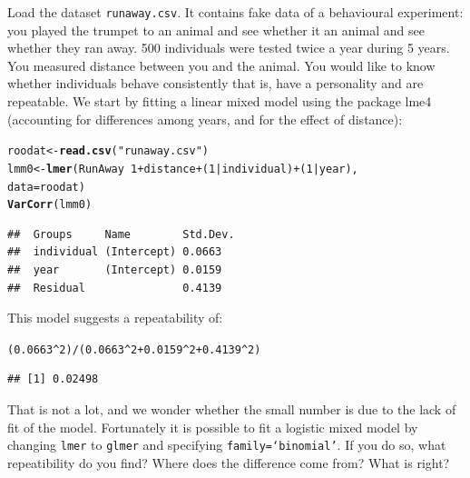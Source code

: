 \documentclass[12pt,a4paper]{scrartcl}\usepackage[]{graphicx}\usepackage[]{color}
\makeatletter
\newcommand{\hlnum}[1]{\textcolor[rgb]{0.686,0.059,0.569}{#1}}%
\newcommand{\hlstr}[1]{\textcolor[rgb]{0.192,0.494,0.8}{#1}}%
\newcommand{\hlopt}[1]{\textcolor[rgb]{0,0,0}{#1}}%
\newcommand{\hlstd}[1]{\textcolor[rgb]{0.345,0.345,0.345}{#1}}%
\newcommand{\hlkwb}[1]{\textcolor[rgb]{0.69,0.353,0.396}{#1}}%
\newcommand{\hlkwc}[1]{\textcolor[rgb]{0.333,0.667,0.333}{#1}}%
\newcommand{\hlkwd}[1]{\textcolor[rgb]{0.737,0.353,0.396}{\textbf{#1}}}%
\newenvironment{kframe}{%
 \def\at@end@of@kframe{}%
 \ifinner\ifhmode%
  \def\at@end@of@kframe{\end{minipage}}%
  \begin{minipage}{\columnwidth}%
 \fi\fi%
 \def\FrameCommand##1{\hskip\@totalleftmargin \hskip-\fboxsep
 \colorbox{shadecolor}{##1}\hskip-\fboxsep
     \hskip-\linewidth \hskip-\@totalleftmargin \hskip\columnwidth}%
 \MakeFramed {\advance\hsize-\width
   \@totalleftmargin\z@ \linewidth\hsize
   \@setminipage}}%
 {\par\unskip\endMakeFramed%
 \at@end@of@kframe}
\newenvironment{knitrout}{}{} %
\makeatother
\begin{document}
\begin{Exercise}[difficulty=2, title={Repeatability, on what scale?}]
Load the dataset \texttt{runaway.csv}. It contains fake data of a behavioural experiment: you played the trumpet to an animal and see whether it an animal and see whether they ran away. 500 individuals were tested twice a year during 5 years. You measured distance between you and the animal. You would like to know whether individuals behave consistently that is, have a personality and are repeatable. We start by fitting a linear mixed model using the package lme4 (accounting for differences among years, and for the effect of distance):
\begin{knitrout}
\color{fgcolor}\begin{kframe}
\begin{alltt}
\hlstd{roodat} \hlkwb{<-} \hlkwd{read.csv}\hlstd{(}\hlstr{"runaway.csv"}\hlstd{)}
\hlstd{lmm0} \hlkwb{<-} \hlkwd{lmer}\hlstd{(RunAway} \hlopt{~} \hlnum{1} \hlopt{+} \hlstd{distance} \hlopt{+}\hlstd{(}\hlnum{1}\hlopt{|}\hlstd{individual)} \hlopt{+} \hlstd{(}\hlnum{1}\hlopt{|}\hlstd{year),}
             \hlkwc{data} \hlstd{= roodat)}
\hlkwd{VarCorr}\hlstd{(lmm0)}
\end{alltt}
\begin{verbatim}
##  Groups     Name        Std.Dev.
##  individual (Intercept) 0.0663  
##  year       (Intercept) 0.0159  
##  Residual               0.4139
\end{verbatim}
\end{kframe}
\end{knitrout}
This model suggests a repeatability of:
\begin{knitrout}
\color{fgcolor}\begin{kframe}
\begin{alltt}
\hlstd{(}\hlnum{0.0663}\hlopt{^}\hlnum{2}\hlstd{)}\hlopt{/}\hlstd{(}\hlnum{0.0663}\hlopt{^}\hlnum{2}\hlopt{+}\hlnum{0.0159}\hlopt{^}\hlnum{2}\hlopt{+}\hlnum{0.4139}\hlopt{^}\hlnum{2}\hlstd{)}
\end{alltt}
\begin{verbatim}
## [1] 0.02498
\end{verbatim}
\end{kframe}
\end{knitrout}
That is not a lot, and we wonder whether the small number is due to the lack of fit of the model. Fortunately it is possible to fit a logistic mixed model by changing \texttt{lmer} to \texttt{glmer} and specifying \texttt{family=`binomial'}. If you do so, what repeatibility do you find? Where does the difference come from? What is right?
\end{Exercise}
\end{document}
